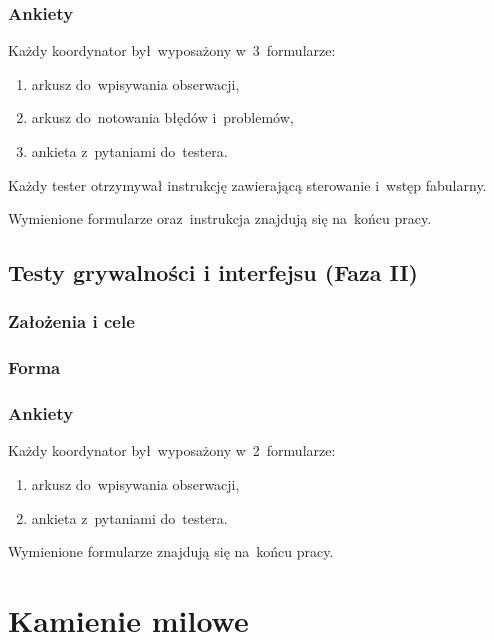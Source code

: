 \documentclass[licencjacka]{pracamgr}
\begin{document}
      \subsection{Ankiety}
      Każdy koordynator był~wyposażony w~3~formularze:
      \begin{enumerate}
	\item arkusz do~wpisywania obserwacji,
	\item arkusz do~notowania błędów i~problemów,
	\item ankieta z~pytaniami do~testera.
      \end{enumerate}
      Każdy tester otrzymywał instrukcję zawierającą sterowanie i~wstęp fabularny.

      \noindent
      Wymienione formularze oraz~instrukcja znajdują się na~końcu pracy.

    \section{Testy grywalności i interfejsu (Faza II)}

      \subsection{Założenia i cele}

      \subsection{Forma}

      \subsection{Ankiety}
      Każdy koordynator był~wyposażony w~2~formularze:
      \begin{enumerate}
	\item arkusz do~wpisywania obserwacji,
	\item ankieta z~pytaniami do~testera.
      \end{enumerate}

      \noindent
      Wymienione formularze znajdują się na~końcu pracy.

\chapter{Kamienie milowe}
\end{document}
